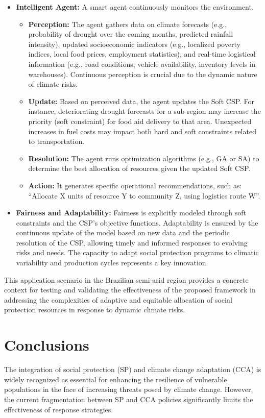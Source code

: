 \documentclass[letterpaper]{article}
\begin{document}
\begin{itemize}
    \item \textbf{Intelligent Agent:} A smart agent continuously monitors the environment.
          \begin{itemize}
              \item \textbf{Perception:} The agent gathers data on climate forecasts (e.g., probability of drought over the coming months, predicted rainfall intensity), updated socioeconomic indicators (e.g., localized poverty indices, local food prices, employment statistics), and real-time logistical information (e.g., road conditions, vehicle availability, inventory levels in warehouses). Continuous perception is crucial due to the dynamic nature of climate risks.
              \item \textbf{Update:} Based on perceived data, the agent updates the Soft CSP. For instance, deteriorating drought forecasts for a sub-region may increase the priority (soft constraint) for food aid delivery to that area. Unexpected increases in fuel costs may impact both hard and soft constraints related to transportation.
              \item \textbf{Resolution:} The agent runs optimization algorithms (e.g., GA or SA) to determine the best allocation of resources given the updated Soft CSP.
              \item \textbf{Action:} It generates specific operational recommendations, such as: ``Allocate X units of resource Y to community Z, using logistics route W''.
          \end{itemize}

    \item \textbf{Fairness and Adaptability:} Fairness is explicitly modeled through soft constraints and the CSP’s objective functions. Adaptability is ensured by the continuous update of the model based on new data and the periodic resolution of the CSP, allowing timely and informed responses to evolving risks and needs. The capacity to adapt social protection programs to climatic variability and production cycles represents a key innovation.
\end{itemize}

This application scenario in the Brazilian semi-arid region provides a concrete context for testing and validating the effectiveness of the proposed framework in addressing the complexities of adaptive and equitable allocation of social protection resources in response to dynamic climate risks.

\section{Conclusions}
The integration of social protection (SP) and climate change adaptation (CCA) is widely recognized as essential for enhancing the resilience of vulnerable populations in the face of increasing threats posed by climate change. However, the current fragmentation between SP and CCA policies significantly limits the effectiveness of response strategies.
\end{document}
